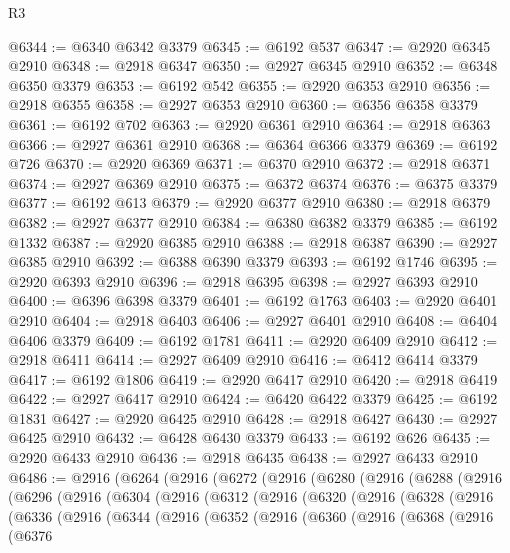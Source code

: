 \begin{lexlean}{R3}
\begin{coremodule}
@6344 := @6340 @6342 @3379
@6345 := @6192 @537
@6347 := @2920 @6345 @2910
@6348 := @2918 @6347
@6350 := @2927 @6345 @2910
@6352 := @6348 @6350 @3379
@6353 := @6192 @542
@6355 := @2920 @6353 @2910
@6356 := @2918 @6355
@6358 := @2927 @6353 @2910
@6360 := @6356 @6358 @3379
@6361 := @6192 @702
@6363 := @2920 @6361 @2910
@6364 := @2918 @6363
@6366 := @2927 @6361 @2910
@6368 := @6364 @6366 @3379
@6369 := @6192 @726
@6370 := @2920 @6369
@6371 := @6370 @2910
@6372 := @2918 @6371
@6374 := @2927 @6369 @2910
@6375 := @6372 @6374
@6376 := @6375 @3379
@6377 := @6192 @613
@6379 := @2920 @6377 @2910
@6380 := @2918 @6379
@6382 := @2927 @6377 @2910
@6384 := @6380 @6382 @3379
@6385 := @6192 @1332
@6387 := @2920 @6385 @2910
@6388 := @2918 @6387
@6390 := @2927 @6385 @2910
@6392 := @6388 @6390 @3379
@6393 := @6192 @1746
@6395 := @2920 @6393 @2910
@6396 := @2918 @6395
@6398 := @2927 @6393 @2910
@6400 := @6396 @6398 @3379
@6401 := @6192 @1763
@6403 := @2920 @6401 @2910
@6404 := @2918 @6403
@6406 := @2927 @6401 @2910
@6408 := @6404 @6406 @3379
@6409 := @6192 @1781
@6411 := @2920 @6409 @2910
@6412 := @2918 @6411
@6414 := @2927 @6409 @2910
@6416 := @6412 @6414 @3379
@6417 := @6192 @1806
@6419 := @2920 @6417 @2910
@6420 := @2918 @6419
@6422 := @2927 @6417 @2910
@6424 := @6420 @6422 @3379
@6425 := @6192 @1831
@6427 := @2920 @6425 @2910
@6428 := @2918 @6427
@6430 := @2927 @6425 @2910
@6432 := @6428 @6430 @3379
@6433 := @6192 @626
@6435 := @2920 @6433 @2910
@6436 := @2918 @6435
@6438 := @2927 @6433 @2910
@6486 := @2916
    (@6264
      (@2916
        (@6272
          (@2916
            (@6280
              (@2916
                (@6288
                  (@2916
                    (@6296
                      (@2916
                        (@6304
                          (@2916
                            (@6312
                              (@2916
                                (@6320
                                  (@2916
                                    (@6328
                                      (@2916
                                        (@6336
                                          (@2916
                                            (@6344
                                              (@2916
                                                (@6352
                                                  (@2916
                                                    (@6360
                                                      (@2916
                                                        (@6368
                                                          (@2916
                                                            (@6376

\end{coremodule}
\end{lexlean}
